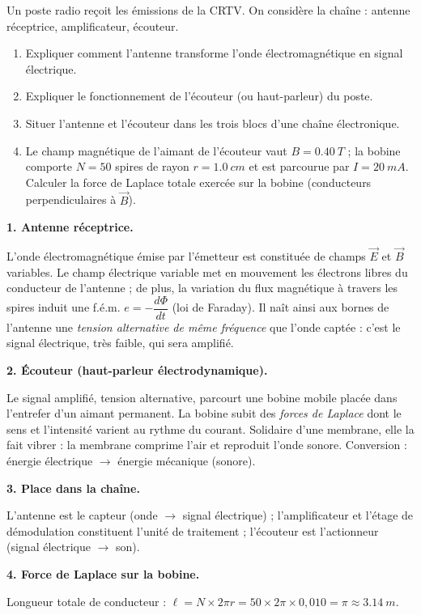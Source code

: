 \documentclass[11pt]{article}
\newcommand{\cle}[1]{{\popxbold\color{popdark}#1}}
\begin{document}
\begin{exoresolu}
Un poste radio reçoit les émissions de la CRTV. On considère la chaîne : antenne réceptrice, amplificateur, écouteur.
\begin{enumerate}
\item Expliquer comment l'antenne transforme l'onde électromagnétique en signal électrique.
\item Expliquer le fonctionnement de l'écouteur (ou haut-parleur) du poste.
\item Situer l'antenne et l'écouteur dans les trois blocs d'une chaîne électronique.
\item Le champ magnétique de l'aimant de l'écouteur vaut $B = \SI{0,40}{T}$ ; la bobine comporte $N = 50$ spires de rayon $r = \SI{1,0}{cm}$ et est parcourue par $I = \SI{20}{mA}$. Calculer la force de Laplace totale exercée sur la bobine (conducteurs perpendiculaires à $\vec{B}$).
\end{enumerate}
\tcblower
\textbf{1. Antenne réceptrice.}

L'onde électromagnétique émise par l'émetteur est constituée de champs $\vec{E}$ et $\vec{B}$ variables. Le champ électrique variable met en mouvement les électrons libres du conducteur de l'antenne ; de plus, la variation du flux magnétique à travers les spires induit une f.é.m. $e = -\dfrac{d\Phi}{dt}$ (loi de Faraday). Il naît ainsi aux bornes de l'antenne une \emph{tension alternative de même fréquence} que l'onde captée : c'est le signal électrique, très faible, qui sera amplifié.

\textbf{2. Écouteur (haut-parleur électrodynamique).}

Le signal amplifié, tension alternative, parcourt une bobine mobile placée dans l'entrefer d'un aimant permanent. La bobine subit des \emph{forces de Laplace} dont le sens et l'intensité varient au rythme du courant. Solidaire d'une membrane, elle la fait vibrer : la membrane comprime l'air et reproduit l'onde sonore. Conversion : énergie électrique $\to$ énergie mécanique (sonore).

\textbf{3. Place dans la chaîne.}

L'antenne est le \cle{capteur} (onde $\to$ signal électrique) ; l'amplificateur et l'étage de démodulation constituent l'\cle{unité de traitement} ; l'écouteur est l'\cle{actionneur} (signal électrique $\to$ son).

\textbf{4. Force de Laplace sur la bobine.}

Longueur totale de conducteur : $\ell = N \times 2\pi r = 50 \times 2\pi \times 0{,}010 = \pi \approx \SI{3,14}{m}$.


\end{exoresolu}
\end{document}
